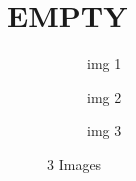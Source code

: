 
\chapter{EMPTY}

\begin{figure}[h!]
    \centering
    \begin{subfigure}{0.3\textwidth}
        \centering
        \caption{img 1}\label{fig:examplesub1}
    \end{subfigure}
    \begin{subfigure}{0.3\textwidth}
        \centering
        \caption{img 2}\label{fig:examplesub2}
    \end{subfigure}
    \begin{subfigure}{0.3\textwidth}
        \centering
        \caption{img 3}\label{fig:examplesub3}
    \end{subfigure}
    \caption{3 Images}\label{fig:examplesub}
\end{figure}

